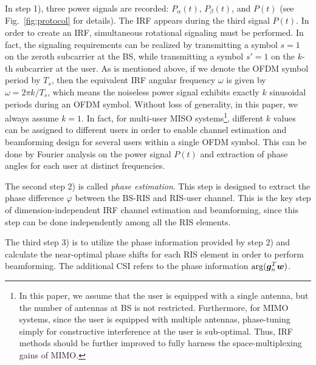 \documentclass[journal,twocolumn]{IEEEtran}
\theoremstyle{nonumberplain}
\begin{document}
    In step 1), three power signals are recorded: $P_{\alpha}(t)$, $P_{\beta}(t)$, and $P(t)$ (see Fig.~\ref{fig:protocol} for details). The IRF appears during the third signal $P(t)$. 
    In order to create an IRF, simultaneous rotational signaling must be performed. 
    In fact, the signaling requirements can be realized by transmitting a symbol $s=1$ on the zeroth subcarrier at the BS, while transmitting a symbol $s'=1$ on the $k$-th subcarrier at the user. 
    As is mentioned above, if we denote the OFDM symbol period by $T_s$, then the equivalent IRF angular frequency $\omega$ is given by $\omega = 2\pi k /T_s$, which means the noiseless power signal exhibits exactly $k$ sinusoidal periods during an OFDM symbol. 
    Without loss of generality, in this paper, we always assume $k=1$. 
    In fact, for multi-user MISO systems\footnote{In this paper, we assume that the user is equipped with a single antenna, but the number of antennas at BS is not restricted. Furthermore, for MIMO systems, since the user is equipped with multiple antennas, phase-tuning simply for constructive interference at the user is sub-optimal. Thus, IRF methods should be further improved to fully harness the space-multiplexing gains of MIMO.}, different $k$ values can be assigned to different users in order to enable channel estimation and beamforming design for several users within a single OFDM symbol. 
    This can be done by Fourier analysis on the power signal $P(t)$ and extraction of phase angles for each user at distinct frequencies. 

    The second step 2) is called {\it phase estimation}. This step is designed to extract the phase difference $\varphi$ between the BS-RIS and RIS-user channel. 
    This is the key step of dimension-independent IRF channel estimation and beamforming, since this step can be done independently among all the RIS elements. 

    The third step 3) is to utilize the phase information provided by step 2) and calculate the near-optimal phase shifts for each RIS element in order to perform beamforming. The additional CSI refers to the phase information ${\rm arg}({\bm g}_n^T {\bm w})$. 
\end{document}
